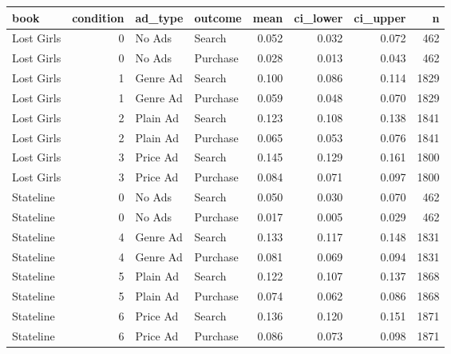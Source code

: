 \begin{tabular}{lrllrrrr}
\toprule
book & condition & ad_type & outcome & mean & ci_lower & ci_upper & n \\
\midrule
Lost Girls & 0 & No Ads & Search & 0.052 & 0.032 & 0.072 & 462 \\
Lost Girls & 0 & No Ads & Purchase & 0.028 & 0.013 & 0.043 & 462 \\
Lost Girls & 1 & Genre Ad & Search & 0.100 & 0.086 & 0.114 & 1829 \\
Lost Girls & 1 & Genre Ad & Purchase & 0.059 & 0.048 & 0.070 & 1829 \\
Lost Girls & 2 & Plain Ad & Search & 0.123 & 0.108 & 0.138 & 1841 \\
Lost Girls & 2 & Plain Ad & Purchase & 0.065 & 0.053 & 0.076 & 1841 \\
Lost Girls & 3 & Price Ad & Search & 0.145 & 0.129 & 0.161 & 1800 \\
Lost Girls & 3 & Price Ad & Purchase & 0.084 & 0.071 & 0.097 & 1800 \\
Stateline & 0 & No Ads & Search & 0.050 & 0.030 & 0.070 & 462 \\
Stateline & 0 & No Ads & Purchase & 0.017 & 0.005 & 0.029 & 462 \\
Stateline & 4 & Genre Ad & Search & 0.133 & 0.117 & 0.148 & 1831 \\
Stateline & 4 & Genre Ad & Purchase & 0.081 & 0.069 & 0.094 & 1831 \\
Stateline & 5 & Plain Ad & Search & 0.122 & 0.107 & 0.137 & 1868 \\
Stateline & 5 & Plain Ad & Purchase & 0.074 & 0.062 & 0.086 & 1868 \\
Stateline & 6 & Price Ad & Search & 0.136 & 0.120 & 0.151 & 1871 \\
Stateline & 6 & Price Ad & Purchase & 0.086 & 0.073 & 0.098 & 1871 \\
\bottomrule
\end{tabular}
